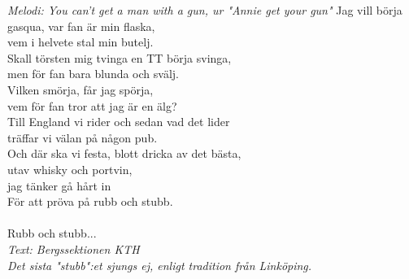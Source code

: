 {\footnotesize\textit{Melodi: You can't get a man with a gun, ur "Annie get your gun"}}
\vspace{10pt}
Jag vill börja gasqua, var fan är min flaska,\\
vem i helvete stal min butelj.\\
Skall törsten mig tvinga en TT börja svinga,\\
men för fan bara blunda och svälj.\\
Vilken smörja, får jag spörja,\\
vem för fan tror att jag är en älg?\\
Till England vi rider och sedan vad det lider\\
träffar vi välan på någon pub.\\
Och där ska vi festa, blott dricka av det bästa,\\
utav whisky och portvin, \\
jag tänker gå hårt in\\
För att pröva på rubb och stubb.\\
\\
Rubb och stubb...\\
\vspace{10pt}
{\footnotesize\textit{Text: Bergssektionen KTH\\
Det sista "stubb":et sjungs ej, enligt tradition från Linköping.}}
